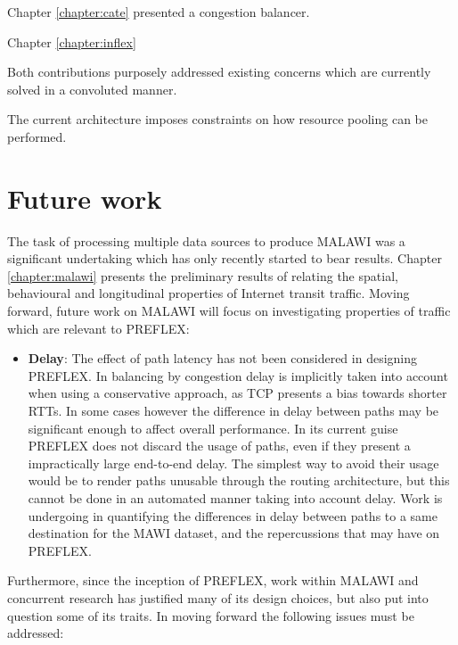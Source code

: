 Chapter \ref{chapter:cate} presented a congestion balancer.
\LOREM
\LOREM

Chapter \ref{chapter:inflex} 

Both contributions purposely addressed existing concerns which are currently solved in a convoluted manner.


The current architecture imposes constraints on how resource pooling can be performed.

\section{Future work}


The task of processing multiple data sources to produce \ac{MALAWI} was a significant undertaking which has only recently started to bear results.
Chapter \ref{chapter:malawi} presents the preliminary results of relating the spatial, behavioural and longitudinal properties of Internet transit traffic.
Moving forward, future work on \ac{MALAWI} will focus on investigating properties of traffic which are relevant to \ac{PREFLEX}:

\begin{itemize}
\item{
    \textbf{Delay}: The effect of path latency has not been considered in designing \ac{PREFLEX}.
    In balancing by congestion delay is implicitly taken into account when using a conservative approach, as \ac{TCP} presents a bias towards shorter \acp{RTT}.
    In some cases however the difference in delay between paths may be significant enough to affect overall performance.
    In its current guise \ac{PREFLEX} does not discard the usage of paths, even if they present a impractically large end-to-end delay.
    The simplest way to avoid their usage would be to render paths unusable through the routing architecture, but this cannot be done in an automated manner taking into account delay.
    Work is undergoing in quantifying the differences in delay between paths to a same destination for the \ac{MAWI} dataset, and the repercussions that may have on \ac{PREFLEX}.
}
\end{itemize}

Furthermore, since the inception of \ac{PREFLEX}, work within \ac{MALAWI} and concurrent research has justified many of its design choices, but also put into question some of its traits.
In moving forward the following issues must be addressed:

